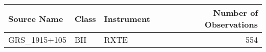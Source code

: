 \begin{tabular}{lllr}
\toprule
 Source Name & Class & Instrument &  Number of Observations \\
\midrule
GRS\_1915+105 &    BH &       RXTE &                     554 \\
\bottomrule
\end{tabular}
